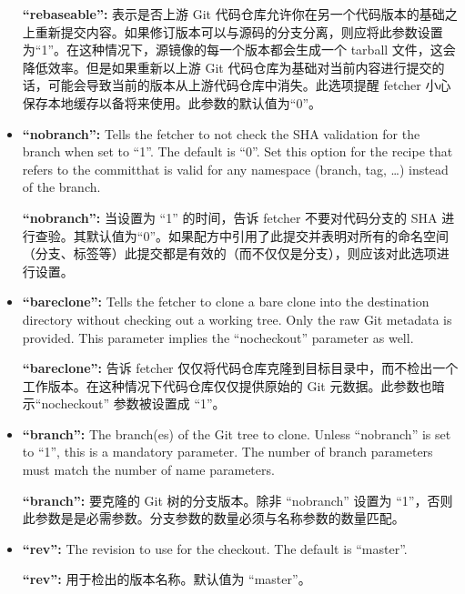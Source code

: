 \begin{itemize}
\medskip
\textbf{``rebaseable'':} 表示是否上游 Git 代码仓库允许你在另一个代码版本的基础之上重新提交内容\footnotemark[1]。如果修订版本可以与源码的分支分离，则应将此参数设置为“1”。在这种情况下，源镜像的每一个版本都会生成一个 tarball 文件，这会降低效率。但是如果重新以上游 Git 代码仓库为基础对当前内容进行提交的话，可能会导致当前的版本从上游代码仓库中消失。此选项提醒 fetcher 小心保存本地缓存以备将来使用。此参数的默认值为“0”。

\item \textbf{``nobranch'':} Tells the fetcher to not check the SHA validation for the branch when set to ``1''. The default is ``0''. Set this option for the recipe that refers to the commit\footnotemark[2] that is valid for any namespace (branch, tag, …) instead of the branch.

\medskip
\textbf{``nobranch'':} 当设置为 ``1'' 的时间，告诉 fetcher 不要对代码分支的 SHA 进行查验。其默认值为“0”。如果配方中引用了此提交\footnotemark[2]并表明对所有的命名空间（分支、标签等）此提交都是有效的（而不仅仅是分支），则应该对此选项进行设置。


\item \textbf{``bareclone'':} Tells the fetcher to clone a bare clone into the destination directory without checking out a working tree. Only the raw Git metadata is provided. This parameter implies the ``nocheckout'' parameter as well.

\medskip
\textbf{``bareclone'':} 告诉 fetcher 仅仅将代码仓库克隆到目标目录中，而不检出一个工作版本。在这种情况下代码仓库仅仅提供原始的 Git 元数据。此参数也暗示``nocheckout'' 参数被设置成 ``1''。

\item \textbf{``branch'':} The branch(es) of the Git tree to clone. Unless ``nobranch'' is set to ``1'', this is a mandatory parameter. The number of branch parameters must match the number of name parameters.

\medskip
\textbf{``branch'':} 要克隆的 Git 树的分支版本。除非 ``nobranch'' 设置为 ``1''，否则此参数是是必需参数。分支参数的数量必须与名称参数的数量匹配。

\item \textbf{``rev'':} The revision to use for the checkout. The default is ``master''.

\medskip
\textbf{``rev'':} 用于检出的版本名称。默认值为 ``master''。


\end{itemize}

